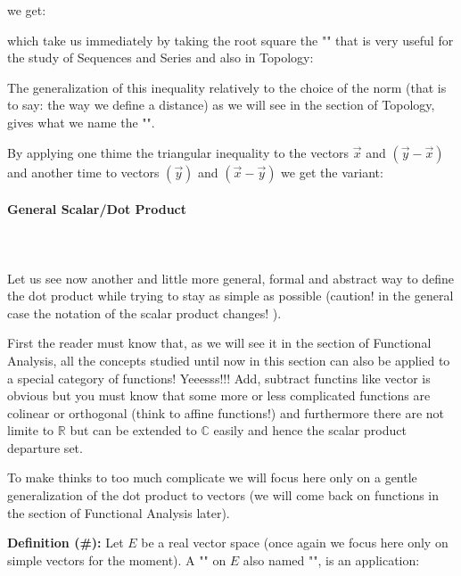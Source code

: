 	we get:
	
	which take us immediately by taking the root square the "" that is very useful for the study of Sequences and Series and also in Topology:
	
	\begin{tcolorbox}[title=Remark,colframe=black,arc=10pt]
	The generalization of this inequality relatively to the choice of the norm (that is to say: the way we define a distance) as we will see in the section of Topology, gives what we name the "".
	\end{tcolorbox}	
	By applying one thime the triangular inequality to the vectors $\vec{x}$ and $(\vec{y}-\vec{x})$ and another time to vectors $(\vec{y})$ and $(\vec{x}-\vec{y})$ we get the variant:
	
	
	\paragraph{General Scalar/Dot Product}\mbox{}\\\\
	Let us see now another and little more general, formal and abstract way to define the dot product while trying to stay as simple as possible (caution! in the general case the notation of the scalar product changes! ).
	
	First the reader must know that, as we will see it in the section of Functional Analysis, all the concepts studied until now in this section can also be applied to a special category of functions! Yeeesss!!! Add, subtract functins like vector is obvious but you must know that some more or less complicated functions are colinear or orthogonal (think to affine functions!) and furthermore there are not limite to $\mathbb{R}$ but can be extended to $\mathbb{C}$ easily and hence the scalar product departure set. 
	
	To make thinks to too much complicate we will focus here only on a gentle generalization of the dot product to vectors (we will come back on functions in the section of Functional Analysis later).
	
	\textbf{Definition (\#\mydef):} Let $E$ be a real vector space (once again we focus here only on simple vectors for the moment). A "" on $E$ also named "", is an application:
	
